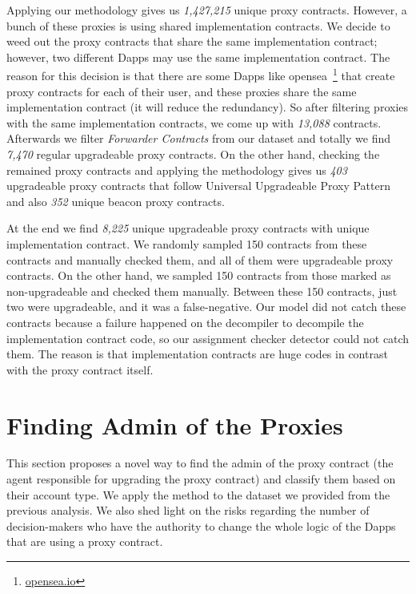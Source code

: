 
Applying our methodology gives us \textit{1,427,215} unique proxy contracts. However, a bunch of these proxies is using shared implementation contracts. We decide to weed out the proxy contracts that share the same implementation contract; however, two different Dapps may use the same implementation contract. The reason for this decision is that there are some Dapps like opensea~\footnote{\url{opensea.io}} that create proxy contracts for each of their user, and these proxies share the same implementation contract (it will reduce the redundancy). So after filtering proxies with the same implementation contracts, we come up with \textit{13,088} contracts.
Afterwards we filter \textit{Forwarder Contracts} from our dataset and totally we find \textit{7,470} regular upgradeable proxy contracts.
On the other hand, checking the remained proxy contracts and applying the methodology gives us \textit{403} upgradeable proxy contracts that follow Universal Upgradeable Proxy Pattern and also \textit{352} unique beacon proxy contracts.

At the end we find \textit{8,225} unique upgradeable proxy contracts with unique implementation contract. We randomly sampled 150 contracts from these contracts and manually checked them, and all of them were upgradeable proxy contracts. On the other hand, we sampled 150 contracts from those marked as non-upgradeable and checked them manually. Between these 150 contracts, just two were upgradeable, and it was a false-negative. Our model did not catch these contracts because a failure happened on the decompiler to decompile the implementation contract code, so our assignment checker detector could not catch them. The reason is that implementation contracts are huge codes in contrast with the proxy contract itself.


\section{Finding Admin of the Proxies}

This section proposes a novel way to find the admin of the proxy contract (the agent responsible for upgrading the proxy contract) and classify them based on their account type. We apply the method to the dataset we provided from the previous analysis. We also shed light on the risks regarding the number of decision-makers who have the authority to change the whole logic of the Dapps that are using a proxy contract.

